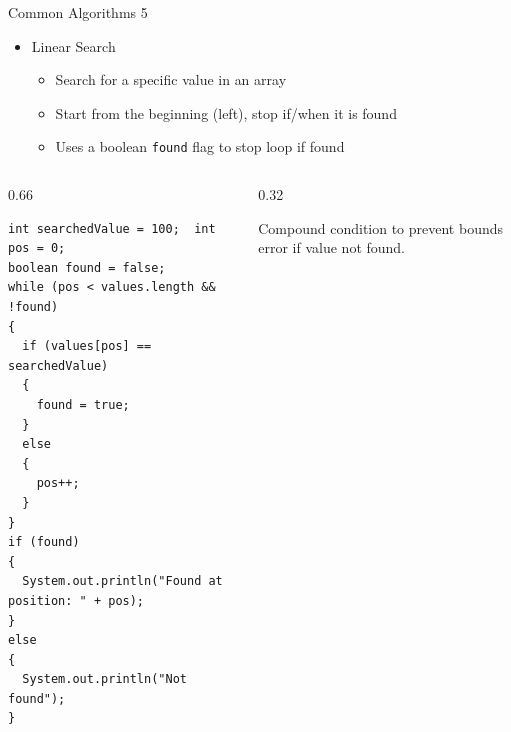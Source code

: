 \documentclass[aspectratio=43,10pt,t]{beamer}
\newcommand{\code}[1]{\texttt{#1}}
\newcommand{\callout}[2][\linewidth]{%
  {\setlength{\fboxsep}{3pt}\colorbox{callout}{%
    \parbox{\dimexpr#1-6pt\relax}{\raggedright\footnotesize #2}}}}
\begin{document}
\begin{frame}[fragile]{Common Algorithms 5}
  \begin{itemize}
    \item Linear Search
      \begin{itemize}
        \item Search for a specific value in an array
        \item Start from the beginning (left), stop if/when it is found
        \item Uses a boolean \code{found} flag to stop loop if found
      \end{itemize}
  \end{itemize}
  \begin{columns}[T]
    \begin{column}{0.66\textwidth}
\begin{lstlisting}[basicstyle=\ttfamily\fontsize{6.2}{7.1}\selectfont]
int searchedValue = 100;  int pos = 0;
boolean found = false;
while (pos < values.length && !found)
{
  if (values[pos] == searchedValue)
  {
    found = true;
  }
  else
  {
    pos++;
  }
}
if (found)
{
  System.out.println("Found at position: " + pos);
}
else
{
  System.out.println("Not found");
}
\end{lstlisting}
    \end{column}
    \begin{column}{0.32\textwidth}
      \vskip10mm
      \callout{Compound condition to prevent bounds error if value not found.}
    \end{column}
  \end{columns}
\end{frame}
\end{document}
